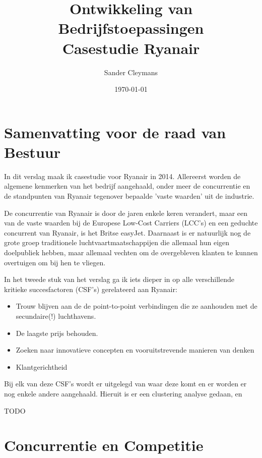 \documentclass{article}
\author{Sander Cleymans}
\date{\today}
\title{Ontwikkeling van Bedrijfstoepassingen \\
		Casestudie Ryanair}
\begin{document}
 

\maketitle

\newpage  

\tableofcontents

\newpage
\part{Samenvatting voor de raad van Bestuur}

In dit verslag maak ik casestudie voor Ryanair in 2014.
Allereerst worden de algemene kenmerken van het bedrijf aangehaald, onder meer de concurrentie en de standpunten van Ryanair tegenover bepaalde 'vaste waarden' uit de industrie.
   
De concurrentie van Ryanair is door de jaren enkele keren verandert, maar een van de vaste waarden bij de Europese Low-Cost Carriers (LCC's) en een geduchte concurrent van Ryanair, is het Britse easyJet. Daarnaast is er natuurlijk nog de grote groep traditionele luchtvaartmaatschappijen die allemaal hun eigen doelpubliek hebben, maar allemaal vechten om de overgebleven klanten te kunnen overtuigen om bij hen te vliegen.
	
In het tweede stuk van het verslag ga ik iets dieper in op alle verschillende kritieke succesfactoren (CSF's) gerelateerd aan Ryanair:

\begin{itemize}
\item Trouw blijven aan de de point-to-point verbindingen die ze aanhouden met de secundaire(!) luchthavens.
\item De laagste prijs behouden.
\item Zoeken naar innovatieve concepten en vooruitstrevende manieren van denken
\item Klantgerichtheid
\end{itemize}

Bij elk van deze CSF's wordt er uitgelegd van waar deze komt en er worden er nog enkele andere aangehaald.
Hieruit is er een clustering analyse gedaan, en 

\begin{center}
\begin{Huge}
TODO
\end{Huge}
\end{center} 

\newpage
\part{Concurrentie en Competitie}
\end{document}
